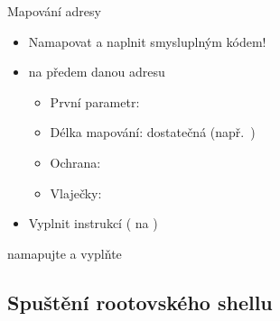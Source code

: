 \begin{frame}[fragile]{Mapování adresy}

  \begin{itemize}
    \item Namapovat a naplnit smysluplným kódem!

    \pause

    \item {} na předem danou adresu
    \begin{itemize}
      \item První parametr: 
      \item Délka mapování: dostatečná (např.\ )
      \item Ochrana: 
      \item Vlaječky: 
    \end{itemize}

    \pause

    \item Vyplnit instrukcí  ( na \xes)
  \end{itemize}

  \pause
  \bigskip

   namapujte a vyplňte

\end{frame}

\subsection{Spuštění rootovského shellu}
\frame{\subsectionpage}

